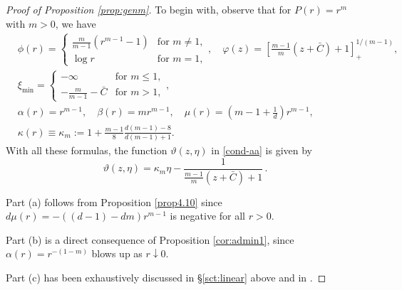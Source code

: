 \documentclass[reqno]{amsart}
\begin{document}
\begin{proof}[Proof of Proposition \ref{prop:genm}]
    To begin with, observe that for $P(r)=r^m$ with $m>0$, we have
    \begin{align}\label{power-constants}
        &\phi(r)=\begin{cases}
            \frac{m}{m-1}(r^{m-1}-1) & \text{for $m\neq1$}, \nonumber\\
            \log r & \text{for $m=1$},
        \end{cases},
        \quad
        \varphi(z) = \left[\frac{m-1}m(z+\bar C)+1\right]_+^{1/(m-1)}, \\
        &\xi_{\min}= \begin{cases}
            -\infty & \text{for $m\le 1$},\\
            -\frac{m}{m-1}-\bar C & \text{for $m>1$},
        \end{cases}, \\
        &\alpha(r)=r^{m-1},\quad \beta(r)=mr^{m-1},\quad \mu(r)=\left(m-1+\frac1d\right)r^{m-1}, \nonumber\\
        &\kappa(r)\equiv\kappa_m:=1+\frac{m-1}8 \frac{d(m-1)-8}{d(m-1)+1}.\nonumber
    \end{align}
With all these formulas, the function $\vartheta(z,\eta)$ in \eqref{cond-aa} is given by
$$
\vartheta(z,\eta)=\kappa_m\eta-\frac{1}{\frac{m-1}m (z+\bar C)+1}\,.
$$

    Part (a) follows from Proposition \ref{prop4.10} since $d\mu(r)=-((d-1)-dm)r^{m-1}$ is negative for all $r>0$.

    Part (b) is a direct consequence of Proposition \ref{cor:admin1}, since $\alpha(r)=r^{-(1-m)}$ blows up as $r\downarrow0$.

    Part (c) has been exhaustively discussed in \S\ref{sct:linear} above and in \cite{AMTU}.


\end{proof}
\end{document}

